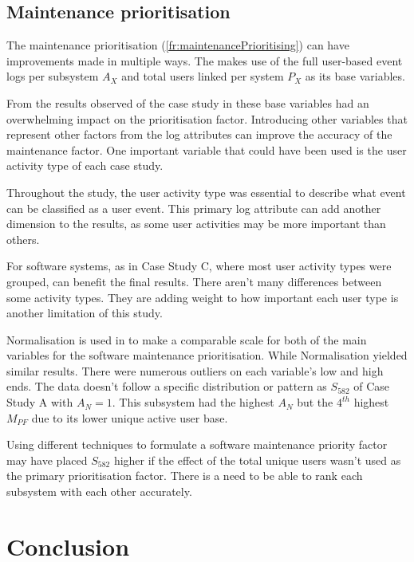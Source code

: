 \subsection{Maintenance prioritisation}
The maintenance prioritisation (\ref{fr:maintenancePrioritising}) can have improvements made in multiple ways. The  makes use of the full user-based event logs per subsystem $A_X$ and total users linked per system $P_X$ as its base variables.\par From the results observed of the case study in  these base variables had an overwhelming impact on the prioritisation factor. Introducing other variables that represent other factors from the log attributes can improve the accuracy of the maintenance factor. One important variable that could have been used is the user activity type of each case study.\par Throughout the study, the user activity type was essential to describe what event can be classified as a user event. This primary log attribute can add another dimension to the results, as some user activities may be more important than others. \par For software systems, as in Case Study C, where most user activity types were grouped, can benefit the final results. There aren't many differences between some activity types. They are adding weight to how important each user type is another limitation of this study.\par Normalisation is used in  to make a comparable scale for both of the main variables for the software maintenance prioritisation. While Normalisation yielded similar results. There were numerous outliers on each variable's low and high ends. The data doesn't follow a specific distribution or pattern as $S_{582}$ of Case Study A with $A_N=1$. This subsystem had the highest $A_N$ but the $4^{th}$ highest $M_{PF}$ due to its lower unique active user base.\par Using different techniques to formulate a software maintenance priority factor may have placed $S_{582}$ higher if the effect of the total unique users wasn't used as the primary prioritisation factor. There is a need to be able to rank each subsystem with each other accurately.

\section{Conclusion}

